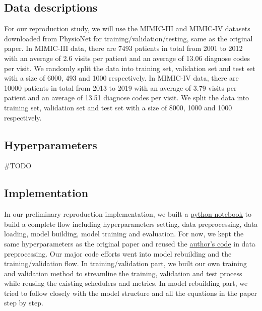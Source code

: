 \documentclass[11pt,a4paper,fleqn]{article}
\begin{document}
\subsection{Data descriptions}
For our reproduction study, we will use the MIMIC-III \cite{mimic3} and
MIMIC-IV \cite{mimic4} datasets downloaded from PhysioNet \cite{physionet} for
training/validation/testing, same as the original paper. In MIMIC-III data,
there are 7493 patients in total from 2001 to 2012 with an average of 2.6 visits
per patient and an average of 13.06 diagnose codes per visit. We randomly split
the data into training set, validation set and test set with a size of 6000, 493
and 1000 respectively. In MIMIC-IV data, there are 10000 patients in total from
2013 to 2019 with an average of 3.79 visits per patient and an average of 13.51
diagnose codes per visit. We split the data into training set, validation set
and test set with a size of 8000, 1000 and 1000 respectively. 

\subsection{Hyperparameters}
\#TODO

\subsection{Implementation}
In our preliminary reproduction implementation, we built a 
\href{https://github.com/willtsai/dlh-sp23-team53/blob/main/notebook.ipynb}{python
notebook} to build a complete flow including hyperparameters setting, data
preprocessing, data loading, model building, model training and evaluation. For
now, we kept the same hyperparameters as the original paper and reused the
\href{https://github.com/LuChang-CS/Chet}{author's code} in data preprocessing.
Our major code efforts went into model rebuilding and the training/validation
flow. In training/validation part, we built our own training and validation
method to streamline the training, validation and test process while reusing the
existing schedulers and metrics. In model rebuilding part, we tried to follow
closely with the model structure and all the equations in the paper step by
step.
\end{document}
